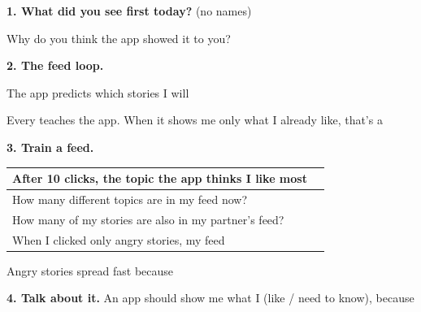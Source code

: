 \documentclass[11pt]{article}
\begin{document}
\partner


\vspace{0.4em}
{\large\textbf{1. What did you see first today?}} (no names) 

\vspace{0.6em}
Why do you think the app showed it to you? 

\vspace{1.0em}
{\large\textbf{2. The feed loop.}}

\vspace{0.4em}
\begin{center}\end{center}

The app predicts which stories I will 

\vspace{0.6em}
Every  teaches the app. When it shows me only what I already like, that's a 

\vspace{1.0em}
{\large\textbf{3. Train a feed.}}

\vspace{0.3em}
\begin{tabular}{|R{4.2in}|R{2.3in}|}
\hline
After 10 clicks, the topic the app thinks I like most &  \\[0.3em] \hline
How many different topics are in my feed now? &  \\[0.3em] \hline
How many of my stories are also in my partner's feed? &  \\[0.3em] \hline
When I clicked only angry stories, my feed &  \\[0.3em] \hline
\end{tabular}

\vspace{0.7em}
Angry stories spread fast because 

\vspace{1.0em}
{\large\textbf{4. Talk about it.}} An app should show me what I (like / need to know), because
\end{document}
